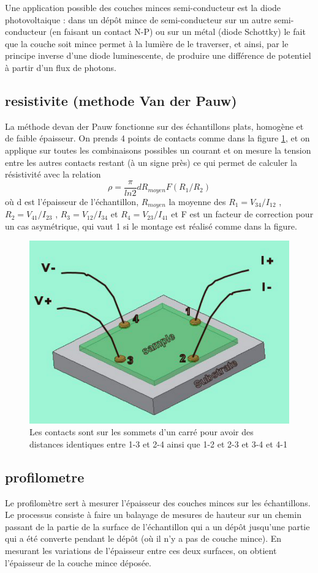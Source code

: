 \documentclass[a4paper,12pt,oneside]{article}
\def \be {\begin{equation}}
\def \ee {\end{equation}}
\begin{document}
Une application possible des couches minces semi-conducteur est la diode photovoltaique : dans un dépôt mince de semi-conducteur sur un autre semi-conducteur (en faisant un contact N-P) ou sur un métal (diode Schottky) le fait que la couche soit mince permet à la lumière de le traverser, et ainsi, par le principe inverse d'une diode luminescente, de produire une différence de potentiel à partir d'un flux de photons. 


\subsection{resistivite (methode Van der Pauw)}
	La méthode devan der Pauw fonctionne sur des échantillons plats, homogène et de faible épaisseur. On prends 4 points de contacts comme dans la figure \ref{fig:illustration_van_der_pauw}, et on applique sur toutes les combinaisons possibles un courant et on mesure la tension entre les autres contacts restant (à un signe près) ce qui permet de calculer la résistivité avec la relation
	\be
		\rho = \frac{\pi}{ln 2} d R_{moyen}  F(R_1/R_2)
	\ee
	où d est l'épaisseur de l'échantillon, $R_{moyen}$ la moyenne des $R_1=V_{34}/I_{12}$ , $R_2=V_{41}/I_{23}$ , $R_3=V_{12}/I_{34}$ et $R_4=V_{23}/I_{41}$ et F est un facteur de correction pour un cas asymétrique, qui vaut 1 si le montage est réalisé comme dans la figure.
		\begin{figure}[h!]
			\begin{center}
			\includegraphics[width=.5\linewidth,angle=0]{./figures/illustration_van_der_pauw.png}
			\caption{Les contacts sont sur les sommets d'un carré pour avoir des distances identiques entre 1-3 et 2-4 ainsi que 1-2 et 2-3 et 3-4 et 4-1} \label{fig:illustration_van_der_pauw}
			\end{center}
		\end{figure}

\subsection{profilometre}
	Le profilomètre sert à mesurer l'épaisseur des couches minces sur les échantillons. Le processus consiste à faire un balayage de mesures de hauteur sur un chemin passant de la partie de la surface de l'échantillon qui a un dépôt jusqu'une partie qui a été converte pendant le dépôt (où il n'y a pas de couche mince). En mesurant les variations de l'épaisseur entre ces deux surfaces, on obtient l'épaisseur de la couche mince déposée.
\end{document}
